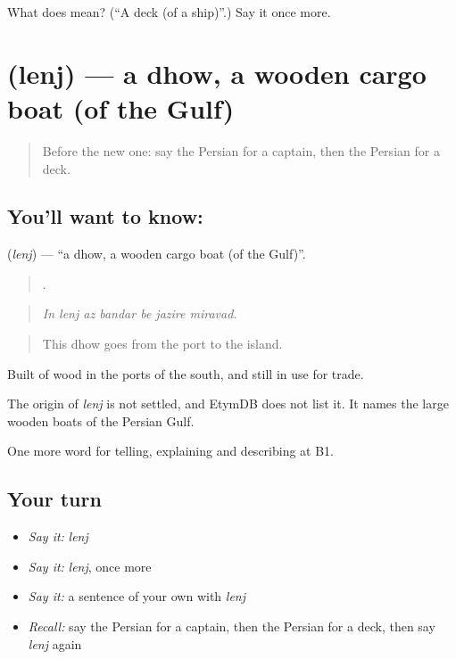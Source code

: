 \begin{tcolorbox}[breakable,colback=teal!4,colframe=teal!35!black,title={Before you move on}]
What does  mean? (\textquotedblleft{}A deck (of a ship)\textquotedblright{}.) Say it once more.
\end{tcolorbox}
\section[\texorpdfstring{\fa{لنج} (lenj)}{لنج (lenj)}]{ (lenj) — a dhow, a wooden cargo boat (of the Gulf)}

\label{lesson:FA-C436-lenj}



\begin{quote}
Before the new one: say the Persian for a captain, then the Persian for a deck.
\end{quote}

\subsection*{You'll want to know: }
\textbf{} (\emph{lenj}) — \textquotedblleft{}a dhow, a wooden cargo boat (of the Gulf)\textquotedblright{}.

\begin{quote}
      .
\end{quote}

\begin{quote}
\emph{In lenj az bandar be jazire miravad.}
\end{quote}

\begin{quote}
This dhow goes from the port to the island.
\end{quote}

Built of wood in the ports of the south, and still in use for trade.

\begin{cousinweb}
The origin of \emph{lenj} is not settled, and EtymDB does not list it. It names the large wooden boats of the Persian Gulf.
\end{cousinweb}

\begin{grammarlens}[title={What you've built}]
One more word for telling, explaining and describing at B1.
\end{grammarlens}

\subsection*{Your turn}
\begin{itemize}
\raggedright
  \item \emph{Say it:} \emph{lenj}
  \item \emph{Say it:} \emph{lenj}, once more
  \item \emph{Say it:} a sentence of your own with \emph{lenj}
  \item \emph{Recall:} say the Persian for a captain, then the Persian for a deck, then say \emph{lenj} again
\end{itemize}

